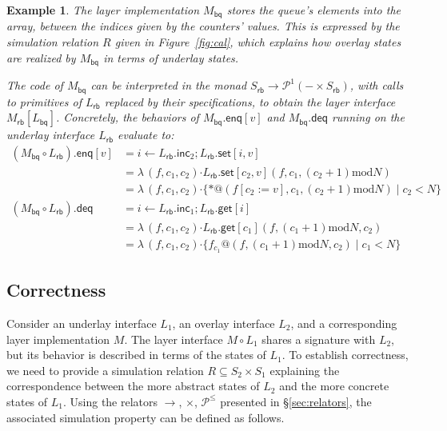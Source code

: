 \documentclass[11pt,oneside]{book}
\newtheorem{example}[theorem]{Example}
\theoremstyle{definition}
\newcommand{\kw}[1]{\ensuremath{ \mathsf{#1} }}
\newcommand{\bdot}{\boldsymbol{\cdot}}
\begin{document}
\begin{example} \label{ex:bqimpl} %
The layer implementation $M_\kw{bq}$ 
stores the queue's elements into the array,
between the indices given by the counters' values.
This is expressed by the simulation relation $R$
given in Figure~\ref{fig:cal},
which explains how overlay states are realized by $M_\kw{bq}$ 
in terms of underlay states.

The code of $M_\kw{bq}$ can be interpreted in the monad
$
    S_\kw{rb} \rightarrow \mathcal{P}^1(- \times S_\kw{rb})
$,
with calls to primitives of $L_\kw{rb}$
replaced by their specifications,
to obtain the layer interface $M_\kw{rb}[L_\kw{bq}]$.
Concretely,
the behaviors of $M_\kw{bq}.\kw{enq}[v]$ and $M_\kw{bq}.\kw{deq}$
running on the underlay interface $L_\kw{rb}$
evaluate to:
\begin{align*}
  (M_\kw{bq} \circ L_\kw{rb}).{\kw{enq}[v]}
    &= i \leftarrow L_\kw{rb}.\kw{inc}_2 \mathbin{;}
        L_\kw{rb}.\kw{set}[i, v] \\
    &= \lambda \, (f, c_1, c_2) \bdot
       L_\kw{rb}.\kw{set}[c_2, v](f, c_1, (c_2+1) \mathbin{\mathrm{mod}} N) \\
    &= \lambda \, (f, c_1, c_2) \bdot
       \{ *@(f[c_2 := v], c_1, (c_2+1) \mathbin{\mathrm{mod}} N) \mid c_2 < N \}
  \\[1em]
  (M_\kw{bq} \circ L_\kw{rb}).\kw{deq}
    &= i \leftarrow L_\kw{rb}.\kw{inc}_1 \mathbin{;}
        L_\kw{rb}.\kw{get}[i] \\
    &= \lambda \, (f, c_1, c_2) \bdot
       L_\kw{rb}.\kw{get}[c_1](f,
          (c_1 + 1) \mathbin{\mathrm{mod}} N,
          c_2) \\
    &= \lambda \, (f, c_1, c_2) \bdot
       \{ f_{c_1}@(f, 
          (c_1 + 1) \mathbin{\mathrm{mod}} N,
          c_2) \mid
          c_1 < N \}
\end{align*}
\end{example}


\subsection{Correctness} %

Consider an underlay interface $L_1$,
an overlay interface $L_2$,
and a corresponding layer implementation $M$.
The layer interface $M \circ L_1$
shares a signature with $L_2$,
but its behavior is described in terms of
the states of $L_1$.
To establish correctness,
we need to provide a simulation relation
$R \subseteq S_2 \times S_1$
explaining the correspondence between
the more abstract states of $L_2$ and
the more concrete states of $L_1$.
Using the relators $\rightarrow$, $\times$, $\mathcal{P}^\le$
presented in \S\ref{sec:relators},
the associated simulation property can be defined as follows.
\end{document}
